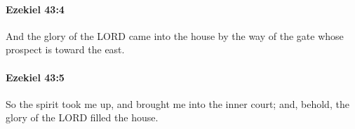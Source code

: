 		\paragraph{Ezekiel 43:4} %
			\label{EZEKIEL-43-4}

			And the glory of the LORD came into the house by the way of the gate whose prospect is toward the east.


		\paragraph{Ezekiel 43:5} %
			\label{EZEKIEL-43-5}

			So the spirit took me up, and brought me into the inner court; and, behold, the glory of the LORD filled the house.


